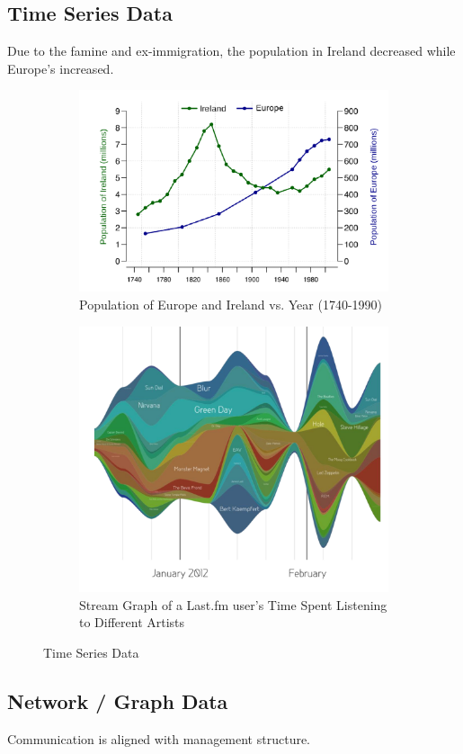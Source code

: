 \documentclass[11pt]{article}
\theoremstyle{definition}
\begin{document}
\subsection{Time Series Data}
Due to the famine and ex-immigration, the population in Ireland decreased while Europe's increased.
\begin{figure}
  \centering
  \begin{subfigure}{.5\textwidth}
    \centering
    \includegraphics[width=.5\linewidth]{7.png}
    \caption{Population of Europe and Ireland vs. Year (1740-1990)}
    \label{fig:sub1}
  \end{subfigure}%
  \begin{subfigure}{.5\textwidth}
    \centering
    \includegraphics[width=.5\linewidth]{8.png}
    \caption{Stream Graph of a Last.fm user’s Time Spent Listening to Different Artists}
    \label{fig:sub2}
  \end{subfigure}
  \caption{Time Series Data}
  \label{fig:1}
\end{figure}
\FloatBarrier
\subsection{Network / Graph Data}
Communication is aligned with management structure.
\end{document}
